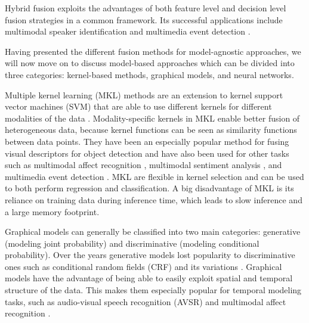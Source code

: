 \documentclass{article}
\begin{document}
Hybrid fusion exploits the advantages of both feature level and decision level fusion strategies in a common framework. Its successful applications include multimodal speaker identification \citep{wu2005speaker} and multimedia event detection \citep{lan2014multimedia}.

Having presented the different fusion methods for model-agnostic approaches, we will now move on to discuss model-based approaches which can be divided into three categories: kernel-based methods, graphical models, and neural networks.

Multiple kernel learning (MKL) methods are an extension to kernel support vector machines (SVM) that are able to use different kernels for different modalities of the data \citep{goenen2011kernel}. Modality-specific kernels in MKL enable better fusion of heterogeneous data, because kernel functions can be seen as similarity functions between data points. They have been an especially popular method for fusing visual descriptors for object detection \citep{bucak2014kernel, gehler2009kernel, krizhevsky2012imagenet} and have also been used for other tasks such as multimodal affect recognition \citep{chen2014recog, jaques2015multi, sikka2013multiple}, multimodal sentiment analysis \citep{poria2015deep}, and multimedia event detection \citep{yeh2012novel}. MKL are flexible in kernel selection and can be used to both perform regression and classification. A big disadvantage of MKL is its reliance on training data during inference time, which leads to slow inference and a large memory footprint.

Graphical models can generally be classified into two main categories: generative (modeling joint probability) and discriminative (modeling conditional probability). Over the years generative models lost popularity to discriminative ones such as conditional random fields (CRF) \citep{lafferty2001crf} and its variations \citep{quattoni2007hcrf, song2012multi, qin2009global}. Graphical models have the advantage of being able to easily exploit spatial and temporal structure of the data. This makes them especially popular for temporal modeling tasks, such as audio-visual speech recognition (AVSR) \citep{gurban2008dynamic} and multimodal affect recognition \citep{baltrusaitis2013dimensional}.
\end{document}
